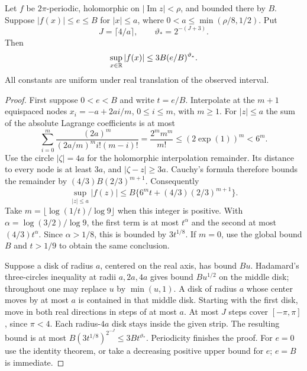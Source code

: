 \begin{lemma}\label{lem:explicit-strip}
Let $f$ be $2\pi$-periodic, holomorphic on $|\operatorname{Im}z|<\rho$,
and bounded there by $B$. Suppose $|f(x)|\le e\le B$ for
$|x|\le a$, where $0<a\le\min(\rho/8,1/2)$. Put
\begin{equation}\label{eq:explicit-strip}
 J=\lceil4/a\rceil,\qquad \vartheta_*=2^{-(J+3)}.
\end{equation}
Then
\[
             \sup_{x\in\mathbb R}|f(x)|\le3B(e/B)^{\vartheta_*}.
\]
All constants are uniform under real translation of the observed interval.
\end{lemma}
\begin{proof}
First suppose $0<e<B$ and write $t=e/B$. Interpolate at the $m+1$
equispaced nodes $x_i=-a+2ai/m$, $0\le i\le m$, with $m\ge1$.
For $|z|\le a$ the sum of the absolute Lagrange coefficients is at most
\[
 \sum_{i=0}^m\frac{(2a)^m}{(2a/m)^m i!(m-i)!}
          =\frac{2^m m^m}{m!}\le(2\exp(1))^m<6^m.
\]
Use the circle $|\zeta|=4a$ for the holomorphic interpolation remainder.
Its distance to every node is at least $3a$, and
$|\zeta-z|\ge3a$. Cauchy's formula therefore bounds the remainder by
$(4/3)B(2/3)^{m+1}$. Consequently
\begin{equation}\label{eq:explicit-interpolation}
 \sup_{|z|\le a}|f(z)|
       \le B\{6^mt+(4/3)(2/3)^{m+1}\}.
\end{equation}
Take $m=\lfloor\log(1/t)/\log9\rfloor$ when this integer is positive.
With $\alpha=\log(3/2)/\log9$, the first term is at most $t^\alpha$
and the second at most $(4/3)t^\alpha$. Since $\alpha>1/8$, this
is bounded by $3t^{1/8}$. If $m=0$, use the global bound $B$ and
$t>1/9$ to obtain the same conclusion.

Suppose a disk of radius $a$, centered on the real axis, has bound
$Bu$. Hadamard's three-circles inequality at radii $a,2a,4a$ gives
bound $Bu^{1/2}$ on the middle disk; throughout one may replace
$u$ by $\min(u,1)$. A disk of radius $a$ whose center moves by at most
$a$ is contained in that middle disk. Starting with the first disk,
move in both real directions in steps of at most $a$. At most $J$
steps cover $[-\pi,\pi]$, since $\pi<4$. Each radius-$4a$ disk stays
inside the given strip. The resulting bound is at most
$B(3t^{1/8})^{2^{-J}}\le3Bt^{\vartheta_*}$.
Periodicity finishes the proof. For $e=0$ use the identity theorem,
or take a decreasing positive upper bound for $e$; $e=B$ is immediate.
\end{proof}

